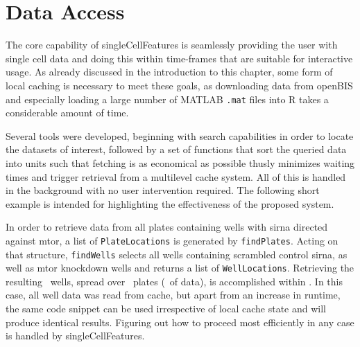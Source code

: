 \section{Data Access}
\label{sec:data-access}
The core capability of singleCellFeatures is seamlessly providing the user with single cell data and doing this within time-frames that are suitable for interactive usage. As already discussed in the introduction to this chapter, some form of local caching is necessary to meet these goals, as downloading data from openBIS and especially loading a large number of MATLAB \texttt{.mat} files into R takes a considerable amount of time.

Several tools were developed, beginning with search capabilities in order to locate the datasets of interest, followed by a set of functions that sort the queried data into units such that fetching is as economical as possible thusly minimizes waiting times and trigger retrieval from a multilevel cache system. All of this is handled in the background with no user intervention required. The following short example is intended for highlighting the effectiveness of the proposed system.



In order to retrieve data from all plates containing wells with \gls{sirna} directed against \gls{mtor}, a list of \texttt{PlateLocations} is generated by \texttt{findPlates}. Acting on that structure, \texttt{findWells} selects all wells containing scrambled control \gls{sirna}, as well as \gls{mtor} knockdown wells and returns a list of \texttt{WellLocations}. Retrieving the resulting \knitrScfFindGetDemoLengthW\ wells, spread over \knitrScfFindGetDemoLengthP\ plates (\knitrScfFindGetDemoSize\ of data), is accomplished within \knitrScfFindGetDemoTime. In this case, all well data was read from cache, but apart from an increase in runtime, the same code snippet can be used irrespective of local cache state and will produce identical results. Figuring out how to proceed most efficiently in any case is handled by singleCellFeatures.

